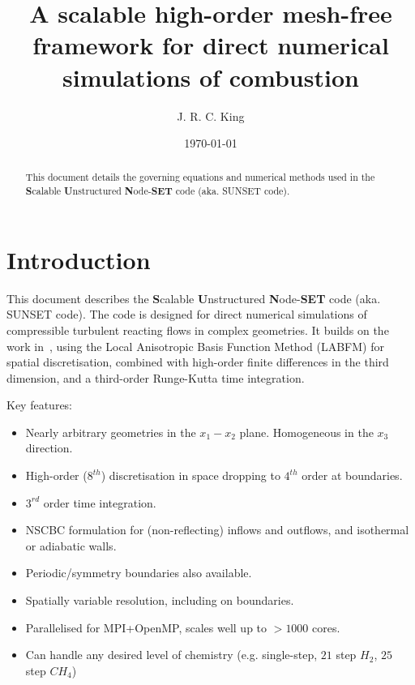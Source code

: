 \documentclass[notitlepage]{revtex4-1}
\begin{document}
\title{A scalable high-order mesh-free framework for direct numerical simulations of combustion}

\author{J. R. C. King}
\date{\today}
\begin{abstract}
This document details the governing equations and numerical methods used in the \textbf{S}calable \textbf{U}nstructured \textbf{N}ode-\textbf{SET} code (aka. SUNSET code).

\end{abstract}

\maketitle

\section{Introduction}

This document describes the \textbf{S}calable \textbf{U}nstructured \textbf{N}ode-\textbf{SET} code (aka. SUNSET code). The code is designed for direct numerical simulations of compressible turbulent reacting flows in complex geometries. It builds on the work in~\cite{king_2020,king_2022}, using the Local Anisotropic Basis Function Method (LABFM) for spatial discretisation, combined with high-order finite differences in the third dimension, and a third-order Runge-Kutta time integration.

Key features:
\begin{itemize}
\item Nearly arbitrary geometries in the $x_{1}-x_{2}$ plane. Homogeneous in the $x_{3}$ direction.
\item High-order ($8^{th}$) discretisation in space dropping to $4^{th}$ order at boundaries.
\item $3^{rd}$ order time integration.
\item NSCBC formulation for (non-reflecting) inflows and outflows, and isothermal or adiabatic walls.
\item Periodic/symmetry boundaries also available.
\item Spatially variable resolution, including on boundaries.
\item Parallelised for MPI+OpenMP, scales well up to $>1000$ cores.
\item Can handle any desired level of chemistry (e.g. single-step, $21$ step $H_{2}$, $25$ step $CH_{4}$)
\end{itemize}
\end{document}
